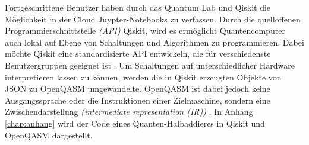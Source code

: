 Fortgeschrittene Benutzer haben durch das Quantum Lab und Qiskit die M\"oglichkeit in der Cloud Juypter-Notebooks zu verfassen. Durch die quelloffenen Programmierschnittstelle \textit{(API)} Qiskit, wird es erm\"oglicht Quantencomputer auch lokal auf Ebene von Schaltungen und Algorithmen zu programmieren. Dabei m\"ochte Qiskit eine standardisierte API entwickeln, die f\"ur verschiedenste Benutzergruppen geeignet ist \cite{Qiskit_backend_2018}. Um Schaltungen auf unterschiedlicher Hardware interpretieren lassen zu k\"onnen, werden die in Qiskit erzeugten Objekte von JSON zu OpenQASM umgewandelte. OpenQASM ist dabei jedoch keine Ausgangssprache oder die Instruktionen einer Zielmaschine, sondern eine Zwischendarstellung \textit{(intermediate representation (IR))} \cite{Openqasm_2017}. In Anhang \ref{chap:anhang} wird der Code eines Quanten-Halbaddieres in Qiskit und OpenQASM dargestellt.

